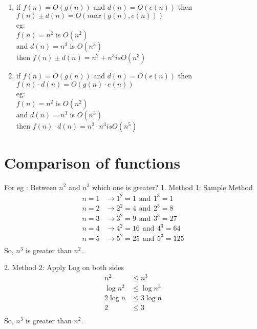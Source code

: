 \documentclass[]{article}
\begin{document}
\begin{enumerate}
\item if $f(n) = O(g(n))$ and $d(n) = O(e(n))$ then $f(n) \pm d(n) = O(max(g(n), e(n)))$\\
eg: \\
\quad $f(n) = n^2$ is $O(n^2)$ \\ \quad and $d(n) = n^3$ is $O(n^3)$ \\ \quad then $f(n) \pm d(n) = n^2 + n^3 is O(n^3)$\\

\item if $f(n) = O(g(n))$ and $d(n) = O(e(n))$ then $f(n) \cdot d(n) = O(g(n) \cdot e(n))$\\
eg: \\
\quad $f(n) = n^2$ is $O(n^2)$ \\ \quad and $d(n) = n^3$ is $O(n^3)$ \\ \quad then $f(n) \cdot d(n) = n^2 \cdot n^3 is O(n^5)$\\
\end{enumerate}

\section{Comparison of functions}

For eg : Between $n^2$ and $n^3$ which one is greater?
1. Method 1: Sample Method
\[
\begin{aligned}
    n = 1 &\rightarrow 1^2 = 1 \hspace{5pt} \text{and} \hspace{5pt} 1^3 = 1 \\
    n = 2 &\rightarrow 2^2 = 4 \hspace{5pt} \text{and} \hspace{5pt} 2^3 = 8 \\
    n = 3 &\rightarrow 3^2 = 9 \hspace{5pt} \text{and} \hspace{5pt} 3^3 = 27 \\
    n = 4 &\rightarrow 4^2 = 16 \hspace{5pt} \text{and} \hspace{5pt} 4^3 = 64 \\
    n = 5 &\rightarrow 5^2 = 25 \hspace{5pt} \text{and} \hspace{5pt} 5^3 = 125 \\
\end{aligned}
\]  
So, $n^3$ is greater than $n^2$.

2. Method 2: Apply Log on both sides
\[
\begin{aligned}
    n^2 &\leq n^3 \\
    \log{n^2} &\leq \log{n^3} \\
    2\log{n} &\leq 3\log{n} \\
    2 &\leq 3 \\
\end{aligned}
\]  
So, $n^3$ is greater than $n^2$.
\end{document}
